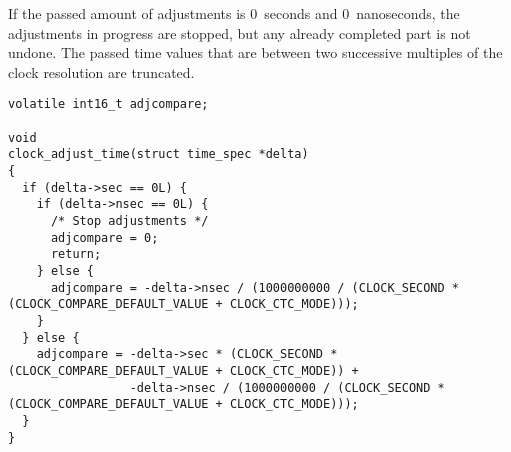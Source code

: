 If the passed amount of adjustments is 0~seconds and 0~nanoseconds,
the adjustments in progress are stopped, but any already completed part is not undone.
The passed time values that are between two successive multiples of the clock resolution are truncated.
\begin{lstlisting}
volatile int16_t adjcompare;

void
clock_adjust_time(struct time_spec *delta)
{
  if (delta->sec == 0L) {
    if (delta->nsec == 0L) {
      /* Stop adjustments */
      adjcompare = 0;
      return;
    } else {
      adjcompare = -delta->nsec / (1000000000 / (CLOCK_SECOND * (CLOCK_COMPARE_DEFAULT_VALUE + CLOCK_CTC_MODE)));
    }
  } else {
    adjcompare = -delta->sec * (CLOCK_SECOND * (CLOCK_COMPARE_DEFAULT_VALUE + CLOCK_CTC_MODE)) +
                 -delta->nsec / (1000000000 / (CLOCK_SECOND * (CLOCK_COMPARE_DEFAULT_VALUE + CLOCK_CTC_MODE)));
  }
}
\end{lstlisting}
